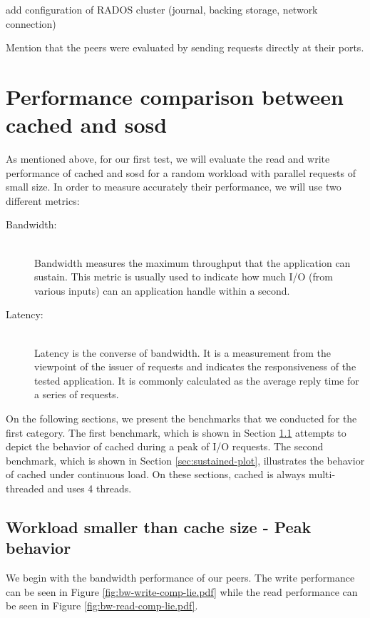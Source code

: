 \todo add configuration of RADOS cluster (journal, backing storage, network 
connection)

\fixme Mention that the peers were evaluated by sending requests directly at 
their ports.

\section{Performance comparison between cached and sosd}
\label{sec:vs-plot}

As mentioned above, for our first test, we will evaluate the read and write 
performance of cached and sosd for a random workload with parallel requests of 
small size. In order to measure accurately their performance, we will use two 
different metrics:

\begin{description}
	\item[Bandwidth:] \hfill \\
		Bandwidth measures the maximum throughput that the application 
		can sustain. This metric is usually used to indicate how much 
		I/O (from various inputs) can an application handle within a 
		second.
	\item[Latency:] \hfill \\
		Latency is the converse of bandwidth. It is a measurement from 
		the viewpoint of the issuer of requests and indicates the 
		responsiveness of the tested application. It is commonly 
		calculated as the average reply time for a series of requests.
\end{description}

On the following sections, we present the benchmarks that we conducted for the 
first category. The first benchmark, which is shown in Section 
\ref{sec:peak-plot} attempts to depict the behavior of cached during a peak of 
I/O requests. The second benchmark, which is shown in Section 
\ref{sec:sustained-plot}, illustrates the behavior of cached under continuous 
load.  On these sections, cached is always multi-threaded and uses 4 threads.

\subsection{Workload smaller than cache size - Peak behavior}
\label{sec:peak-plot}

We begin with the bandwidth performance of our peers. The write performance can 
be seen in Figure \ref{fig:bw-write-comp-lie.pdf} while the read performance 
can be seen in Figure \ref{fig:bw-read-comp-lie.pdf}.


